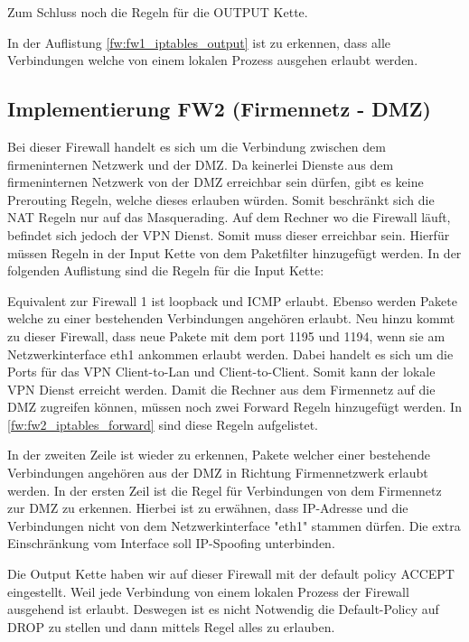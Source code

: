 Zum Schluss noch die Regeln für die OUTPUT Kette.

In der Auflistung \ref{fw:fw1_iptables_output} ist zu erkennen, dass alle Verbindungen welche von einem lokalen Prozess ausgehen erlaubt werden.

\subsection{Implementierung FW2 (Firmennetz - DMZ)}
Bei dieser Firewall handelt es sich um die Verbindung zwischen dem firmeninternen Netzwerk und der DMZ. Da keinerlei Dienste aus dem firmeninternen Netzwerk von der DMZ erreichbar sein dürfen, gibt es keine Prerouting Regeln, welche dieses erlauben würden. Somit beschränkt sich die NAT Regeln nur auf das Masquerading. 
Auf dem Rechner wo die Firewall läuft, befindet sich jedoch der VPN Dienst. Somit muss dieser erreichbar sein. Hierfür müssen Regeln in der Input Kette von dem Paketfilter hinzugefügt werden. In der folgenden Auflistung sind die Regeln für die Input Kette:

Equivalent zur Firewall 1 ist loopback und ICMP erlaubt. Ebenso werden Pakete welche zu einer bestehenden Verbindungen angehören erlaubt. Neu hinzu kommt zu dieser Firewall, dass neue Pakete mit dem port 1195 und 1194, wenn sie am Netzwerkinterface eth1 ankommen erlaubt werden. Dabei handelt es sich um die Ports für das VPN Client-to-Lan und Client-to-Client. Somit kann der lokale VPN Dienst erreicht werden.
Damit die Rechner aus dem Firmennetz auf die DMZ zugreifen können, müssen noch zwei Forward Regeln hinzugefügt werden. In \ref{fw:fw2_iptables_forward} sind diese Regeln aufgelistet.

In der zweiten Zeile ist wieder zu erkennen, Pakete welcher einer bestehende Verbindungen angehören aus der DMZ in Richtung Firmennetzwerk erlaubt werden. In der ersten Zeil ist die Regel für Verbindungen von dem Firmennetz zur DMZ zu erkennen. Hierbei ist zu erwähnen, dass IP-Adresse und die Verbindungen nicht von dem Netzwerkinterface "eth1" stammen dürfen. Die extra Einschränkung vom Interface soll IP-Spoofing unterbinden.

Die Output Kette haben wir auf dieser Firewall mit der default policy ACCEPT eingestellt. Weil jede Verbindung von einem lokalen Prozess der Firewall ausgehend ist erlaubt. Deswegen ist es nicht Notwendig die Default-Policy auf DROP zu stellen und dann mittels Regel alles zu erlauben.

